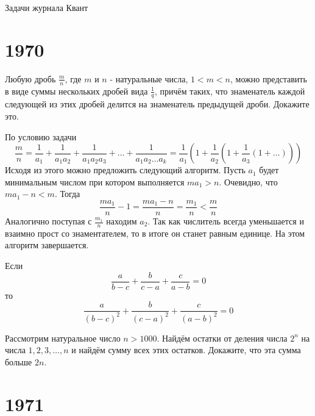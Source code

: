 \documentclass[11pt, a4paper]{template}
\begin{document}
\begin{titlepage}
  \begin{center}
	\Huge{Задачи журнала Квант}
  \end{center}
\end{titlepage}

\chapter{1970}

\begin{exercise}[M24]
Любую дробь $\frac{m}{n}$, где $m$ и $n$ - натуральные числа, $1 < m < n$, можно представить в виде суммы нескольких дробей вида $\frac{1}{q}$, причём таких, что знаменатель каждой следующей из этих дробей делится на знаменатель предыдущей дроби. Докажите это.
\end{exercise}

\begin{solution}
По условию задачи
$$
\frac{m}{n} = \frac{1}{a_{1}} + \frac{1}{a_{1}a_{2}} + \frac{1}{a_{1}a_{2}a_{3}} + \dots + \frac{1}{a_{1}a_{2}\dots a_{k}} = \frac{1}{a_{1}} \left( 1 + \frac{1}{a_{2}} \left( 1 + \frac{1}{a_{3}} (1 + \dots ) \right) \right)
$$
Исходя из этого можно предложить следующий алгоритм. Пусть $a_{1}$ будет  минимальным числом при котором выполняется $ma_{1} > n$. Очевидно, что $ma_{1} - n < m$. Тогда 
$$
\frac{ma_{1}}{n} - 1 = \frac{ma_{1}-n}{n} = \frac{m_{1}}{n} < \frac{m}{n}
$$
Аналогично поступая с $\frac{m_{1}}{n}$ находим $a_{2}$. Так как числитель всегда уменьшается и взаимно прост со знаментателем, то в итоге он станет равным единице. На этом алгоритм завершается. 
\end{solution}

\begin{exercise}[M27]
Если
$$
\frac{a}{b-c} + \frac{b}{c-a} + \frac{c}{a-b} = 0
$$
то
$$
\frac{a}{(b-c)^{2}} + \frac{b}{(c-a)^{2}} + \frac{c}{(a-b)^{2}} = 0
$$
\end{exercise}

\begin{exercise}[M33]
Рассмотрим натуральное число $n > 1000$. Найдём остатки от деления числа $2^{n}$ на числа $1, 2, 3, \dots, n$ и найдём сумму всех этих остатков. Докажите, что эта сумма больше $2n$.
\end{exercise}

\chapter{1971}
\end{document}
